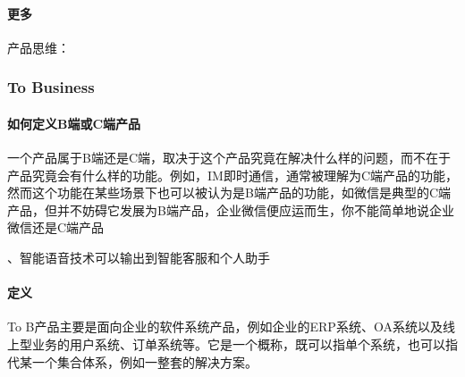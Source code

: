 \documentclass[letterpaper,10pt,english]{sphinxmanual}
\begin{document}
\paragraph{更多}
\label{\detokenize{chapter_introduction/Product:id53}}
产品思维：


\subsubsection{To Business}
\label{\detokenize{chapter_introduction/2B:to-business}}\label{\detokenize{chapter_introduction/2B::doc}}

\paragraph{如何定义B端或C端产品}
\label{\detokenize{chapter_introduction/2B:bc}}
一个产品属于B端还是C端，取决于这个产品究竟在解决什么样的问题，而不在于产品究竟会有什么样的功能。例如，IM即时通信，通常被理解为C端产品的功能，然而这个功能在某些场景下也可以被认为是B端产品的功能，如微信是典型的C端产品，但并不妨碍它发展为B端产品，企业微信便应运而生，你不能简单地说企业微信还是C端产品
%
\begin{footnote}[59]\sphinxAtStartFootnote
{}
%
\end{footnote}、智能语音技术可以输出到智能客服和个人助手
%
\begin{footnote}[60]\sphinxAtStartFootnote
{}
%
\end{footnote}


\paragraph{定义}
\label{\detokenize{chapter_introduction/2B:id1}}
To
B产品主要是面向企业的软件系统产品，例如企业的ERP系统、OA系统以及线上型业务的用户系统、订单系统等。它是一个概称，既可以指单个系统，也可以指代某一个集合体系，例如一整套的解决方案。
%
\begin{footnote}[61]\sphinxAtStartFootnote
{}
%
\end{footnote}
\end{document}
